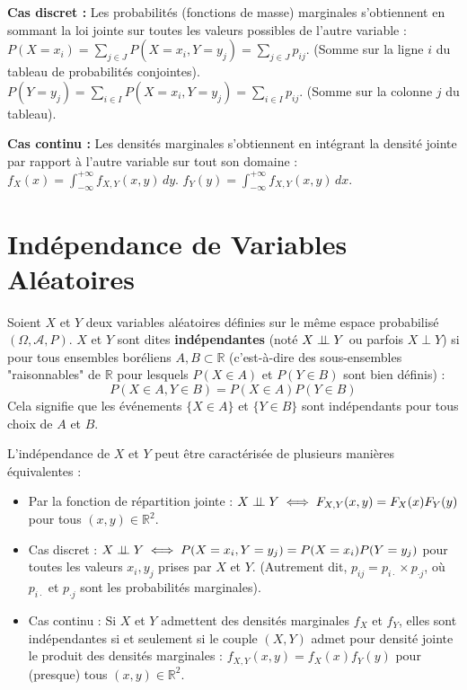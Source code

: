 \vspace{1em}

\textbf{Cas discret :} Les probabilités (fonctions de masse) marginales s'obtiennent en sommant la loi jointe sur toutes les valeurs possibles de l'autre variable : $P(X = x_i) = \sum_{j \in J} P(X = x_i, Y = y_j) = \sum_{j \in J} p_{ij}$. (Somme sur la ligne $i$ du tableau de probabilités conjointes). $P(Y = y_j) = \sum_{i \in I} P(X = x_i, Y = y_j) = \sum_{i \in I} p_{ij}$. (Somme sur la colonne $j$ du tableau).

\vspace{1em}

\textbf{Cas continu :} Les densités marginales s'obtiennent en intégrant la densité jointe par rapport à l'autre variable sur tout son domaine : $f_X(x) = \int_{-\infty}^{+\infty} f_{X,Y}(x, y) \, dy$. $f_Y(y) = \int_{-\infty}^{+\infty} f_{X,Y}(x, y) \, dx$.

\section{Indépendance de Variables Aléatoires}

\begin{definition}
Soient $X$ et $Y$ deux variables aléatoires définies sur le même espace probabilisé $(\Omega, \mathcal{A}, P)$. $X$ et $Y$ sont dites \textbf{indépendantes} (noté $X \mathrel{\perp\!\!\!\perp} Y$ ou parfois $X \perp Y$) si pour tous ensembles boréliens $A, B \subset \mathbb{R}$ (c'est-à-dire des sous-ensembles "raisonnables" de $\mathbb{R}$ pour lesquels $P(X \in A)$ et $P(Y \in B)$ sont bien définis) :
\[
P(X \in A, Y \in B) = P(X \in A)P(Y \in B)
\]
Cela signifie que les événements $\{X \in A\}$ et $\{Y \in B\}$ sont indépendants pour tous choix de $A$ et $B$.
\end{definition}

\begin{proposition}
L'indépendance de $X$ et $Y$ peut être caractérisée de plusieurs manières équivalentes :
\begin{itemize}
    \item Par la fonction de répartition jointe : $X \mathrel{\perp\!\!\!\perp} Y \iff F_{X,Y}(x,y) = F_X(x)F_Y(y)$ pour tous $(x, y) \in \mathbb{R}^2$.
    \item Cas discret : $X \mathrel{\perp\!\!\!\perp} Y \iff P(X = x_i, Y = y_j) = P(X = x_i)P(Y = y_j)$ pour toutes les valeurs $x_i, y_j$ prises par $X$ et $Y$. (Autrement dit, $p_{ij} = p_{i \cdot} \times p_{\cdot j}$, où $p_{i \cdot}$ et $p_{\cdot j}$ sont les probabilités marginales).
    \item Cas continu : Si $X$ et $Y$ admettent des densités marginales $f_X$ et $f_Y$, elles sont indépendantes si et seulement si le couple $(X, Y)$ admet pour densité jointe le produit des densités marginales : $f_{X,Y}(x,y) = f_X(x)f_Y(y)$ pour (presque) tous $(x, y) \in \mathbb{R}^2$.
\end{itemize}
\end{proposition}

